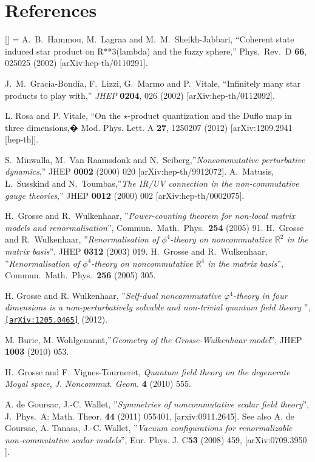 \documentclass[a4paper,11pt]{article}
\numberwithin{equation}{section}
\renewenvironment{thebibliography}[1]
         {\section*{References}\frenchspacing\small
          \begin{list}{[\arabic{enumi}]}
         {\usecounter{enumi}\parsep=2pt\topsep 0pt
         \settowidth{\labelwidth}{[#1]}
         \leftmargin=\labelwidth\advance\leftmargin\labelsep
         \rightmargin=0pt\itemsep=1pt\sloppy}}{\end{list}}
\theoremstyle{nonumberplain}
\begin{document}
\begin{thebibliography}{50}
 A.~B.~Hammou, M.~Lagraa and M.~M.~Sheikh-Jabbari,
  ``Coherent state induced star product on R**3(lambda) and the fuzzy sphere,''
  {Phys.\ Rev.\ D}  {\bf 66}, 025025 (2002)
  [arXiv:hep-th/0110291].

J.~M.~Gracia-Bond\'ia, F.~Lizzi, G.~Marmo and P.~Vitale,
  ``Infinitely many star products to play with,''
  \emph{JHEP} {\bf 0204}, 026 (2002)
  [arXiv:hep-th/0112092].
  
 L. Rosa and P. Vitale, ``On the $\star$-product quantization and the Duflo map in three dimensions,�  Mod.
Phys. Lett. A {\bf 27}, 1250207 (2012) 
[arXiv:1209.2941 [hep-th]].


 S.~Minwalla, M.~Van Raamsdonk and N.~Seiberg,''{\it{Noncommutative perturbative dynamics}},'' JHEP {\bf 0002} (2000) 020 [arXiv:hep-th/9912072]. A.~Matusis, L.~Susskind and N.~Toumbas,''{\it{The IR/UV connection in the non-commutative gauge theories}},'' JHEP {\bf 0012} (2000) 002 [arXiv:hep-th/0002075].


H.~Grosse and R.~Wulkenhaar, ''{\it{Power-counting theorem for non-local matrix models and renormalisation}}'', Commun.\ Math.\ Phys.\  {\bf 254} (2005) 91. H.~Grosse and R.~Wulkenhaar, ''{\it{Renormalisation of $\phi^4$-theory on noncommutative $\mathbb{R}^2$ in the matrix basis}}'', JHEP {\bf 0312} (2003) 019. 
H.~Grosse and R.~Wulkenhaar, ''{\it{Renormalisation of $\phi^4$-theory on noncommutative $\mathbb{R}^4$ in the matrix basis}}'', 
Commun.\ Math.\ Phys.\  {\bf 256} (2005) 305.

H. Grosse and R. Wulkenhaar, ''{\it{Self-dual noncommutative $\varphi^4$-theory in four dimensions is a non-perturbatively solvable and non-trivial quantum field theory}} '', \href{http://www.arxiv.org/abs/1205.0465}{\texttt{[arXiv:1205.0465]}} (2012).

 M. Buric, M. Wohlgenannt,''{\it{Geometry of the Grosse-Wulkenhaar model}}'', JHEP {\bf{1003}} (2010) 053.

 H.~Grosse and F.~Vignes-Tourneret, \textit{{Quantum field theory on the
  degenerate Moyal space}}, \textit{J. Noncommut. Geom.} \textbf{4} (2010)
  555.

 A. de Goursac, J.-C. Wallet, ''{\it{Symmetries of noncommutative scalar field theory}}'', J.\ Phys.\ A: Math. Theor. {\bf{44}} (2011) 055401, [arxiv:0911.2645]. 
See also A. de Goursac, A. Tanasa, J.-C. Wallet, ''{\it{Vacuum configurations for renormalizable non-commutative scalar models}}'', Eur. Phys. J. C{\bf{53}} (2008) 459, [arXiv:0709.3950 ].


\end{thebibliography}
\end{document}
